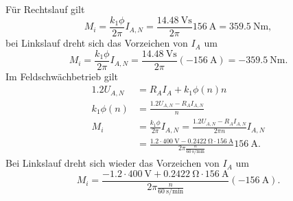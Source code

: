 \documentclass[11pt,a4paper]{scrartcl}
\newcommand{\mybr}[1]{\left(#1\right)}
\newcommand{\0}{_{\mybr{0}}}
\newcommand{\1}{_{\mybr{1}}}
\newcommand{\2}{_{\mybr{2}}}
\begin{document}
\subsection{}
Für Rechtslauf gilt
\begin{equation}
M_i=\frac{k_1\phi}{2\pi}I_{A,N}=\frac{\SI{14.48}{\volt\second}}{2\pi}\SI{156}{\ampere}=\SI{359.5}{\newton\metre},
\end{equation}
bei Linkslauf dreht sich das Vorzeichen von $I_A$ um
\begin{equation}
M_i=\frac{k_1\phi}{2\pi}I_{A,N}=\frac{\SI{14.48}{\volt\second}}{2\pi}\mybr{\SI{-156}{\ampere}}=\SI{-359.5}{\newton\metre}.
\end{equation}
Im Feldschwächbetrieb gilt
\begin{align}
\num{1.2}U_{A,N}&=R_A I_A+k_1\phi\mybr{n} n\\
k_1\phi\mybr{n}&=\frac{\num{1.2}U_{A,N}-R_A I_{A,N}}{n}\\
M_i&=\frac{k_1\phi}{2\pi}I_{A,N}=\frac{\num{1.2}U_{A,N}-R_A I_{A,N}}{2\pi n}I_{A,N}\\
&=\frac{\num{1.2}\cdot\SI{400}{\volt}-\SI{0.2422}{\ohm}\cdot\SI{156}{\ampere}}{2\pi\frac{n}{\SI{60}{\second\per\minute}}}\SI{156}{\ampere}.
\end{align}
Bei Linkslauf dreht sich wieder das Vorzeichen von $I_A$ um
\begin{equation}
M_i=\frac{-\num{1.2}\cdot\SI{400}{\volt}+\SI{0.2422}{\ohm}\cdot\SI{156}{\ampere}}{2\pi\frac{n}{\SI{60}{\second\per\minute}}}\mybr{\SI{-156}{\ampere}}.
\end{equation}
\begin{figure*}[!ht]
\centering
{}
\end{figure*}
\end{document}
